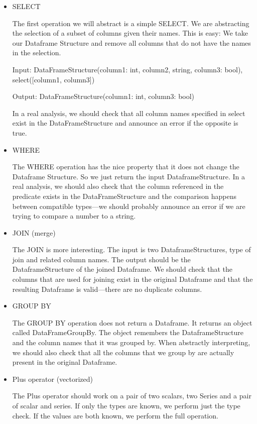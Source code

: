 \begin{itemize}
    \item SELECT

    The first operation we will abstract is a simple SELECT\@.
    We are abstracting the selection of a subset of columns given their names.
    This is easy: We take our Dataframe Structure and remove all columns that do not have the names in the selection.
    \begin{example}

        Input: DataFrameStructure(column1: int, column2, string, column3: bool), select([column1, column3])

        Output: DataFrameStructure(column1: int, column3: bool)
    \end{example}
    In a real analysis, we should check that all column names specified in select exist in the DataFrameStructure and
    announce an error if the opposite is true.

    \item WHERE

    The WHERE operation has the nice property that it does not change the Dataframe Structure.
    So we just return the input DataframeStructure.
    In a real analysis, we should also check that the column referenced in the predicate exists in the DataFrameStructure
    and the comparison happens between compatible types---we should probably announce an error if we are trying to compare
    a number to a string.

    \item JOIN (merge)

    The JOIN is more interesting.
    The input is two DataframeStructures, type of join and related column names.
    The output should be the DataframeStructure of the joined Dataframe.
    We should check that the columns that are used for joining exist in the original Dataframe and that the resulting
    Dataframe is valid---there are no duplicate columns.

    \item GROUP BY

    The GROUP BY operation does not return a Dataframe.
    It returns an object called DataFrameGroupBy.
    The object remembers the DataframeStructure and the column names that it was grouped by.
    When abstractly interpreting, we should also check that all the columns that we group by are actually present in the
    original Dataframe.

    \item Plus operator (vectorized)

    The Plus operator should work on a pair of two scalars, two Series and a pair of scalar and series.
    If only the types are known, we perform just the type check.
    If the values are both known, we perform the full operation.

\end{itemize}

